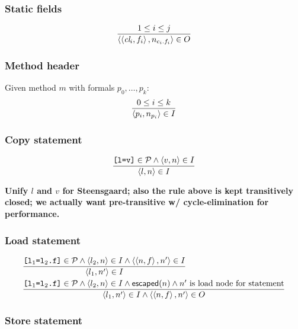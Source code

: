 \documentclass[11pt,notitlepage]{article}
\newcommand{\bigvar}[1]{\ensuremath{\text{\it #1}}}
\newcommand{\func}[1]{\ensuremath{\text{\sffamily #1}}}
\begin{document}
\subsubsection{Static fields}

\begin{displaymath}
\dfrac{1\leq i \leq j}{\tuple{\tuple{\bigvar{cl}_i,f_i},n_{c_i.f_i}}\in O}
\end{displaymath}

\subsubsection{Method header}
Given method $m$ with formals $p_0,\ldots,p_k$:
\begin{displaymath}
\dfrac{0\leq i \leq k}{\left\langle p_i, n_{p_i} \right\rangle\in I}
\end{displaymath}

\subsubsection{Copy statement}

\begin{displaymath}
\dfrac
{\text{\tt [l=v]}\in\mathcal{P} \wedge \left\langle v,n \right\rangle\in I}
{\left\langle l,n \right\rangle\in I}
\end{displaymath}

\textbf{Unify $l$ and $v$ for Steensgaard;  also the rule above is
  kept transitively closed; we actually want pre-transitive w/
  cycle-elimination for performance.}

\subsubsection{Load statement}

\begin{eqnarray*}
&
\dfrac
{\text{\tt [l$_1$=l$_2$.f]}\in\mathcal{P} \wedge
 \tuple{l_2,n}\in I \wedge
 \tuple{\tuple{n,f},n'}\in I}
{\tuple{l_1,n'}\in I}
\\&
\dfrac
{\text{\tt [l$_1$=l$_2$.f]}\in\mathcal{P} \wedge
 \tuple{l_2,n}\in I \wedge
 \func{escaped}(n) \wedge
 n' \text{ is load node for statement} }
{\tuple{l_1,n'}\in I \wedge \tuple{\tuple{n,f},n'}\in O}
\end{eqnarray*}

\subsubsection{Store statement}
\end{document}
